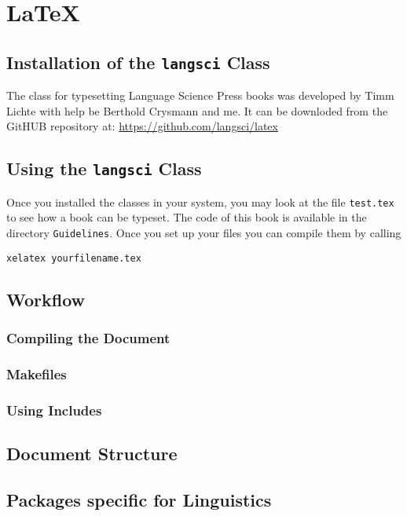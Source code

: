 \chapter{\LaTeX}

\section{Installation of the \texttt{langsci} Class}

The \latex class for typesetting Language Science Press books was developed by Timm Lichte with
help be Berthold Crysmann and me. It can be downloded from the GitHUB repository at: \url{https://github.com/langsci/latex}

\section{Using the \texttt{langsci} Class}

Once you installed the classes in your system, you may look at the file \texttt{test.tex} to see how
a book can be typeset. The code of this book is available in the directory \texttt{Guidelines}. Once
you set up your \latex files you can compile them by calling 
\begin{verbatim}
xelatex yourfilename.tex
\end{verbatim}


\section{Workflow}

\subsection{Compiling the Document}

\subsection{Makefiles}

\subsection{Using Includes}


\section{Document Structure}


\section{Packages specific for Linguistics}

